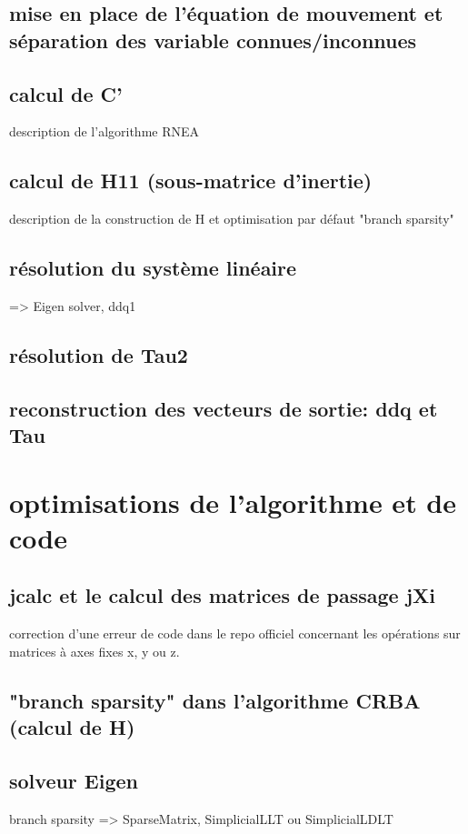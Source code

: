 \documentclass{report}
\begin{document}
\subsection{mise en place de l'équation de mouvement et séparation des variable connues/inconnues}

\subsection{calcul de C'}
description de l'algorithme RNEA

\subsection{calcul de H11 (sous-matrice d'inertie)}
description de la construction de H et optimisation par défaut "branch sparsity"

\subsection{résolution du système linéaire}
=> Eigen solver, ddq1

\subsection{résolution de Tau2}

\subsection{reconstruction des vecteurs de sortie: ddq et Tau}


\section{optimisations de l'algorithme et de code}

\subsection{jcalc et le calcul des matrices de passage jXi}
correction d'une erreur de code dans le repo officiel concernant les opérations sur matrices à axes fixes x, y ou z.

\subsection{"branch sparsity" dans l'algorithme CRBA (calcul de H)}

\subsection{solveur Eigen}
branch sparsity => SparseMatrix, SimplicialLLT ou SimplicialLDLT
\end{document}
